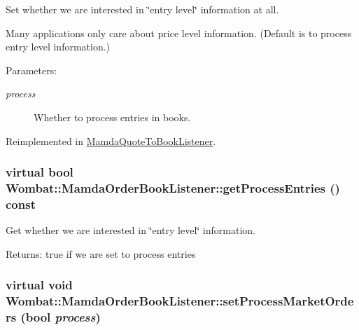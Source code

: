 Set whether we are interested in \char`\"{}entry level\char`\"{} information at all. 

Many applications only care about price level information. (Default is to process entry level information.)

\begin{Desc}
\item[Parameters:]
\begin{description}
\item[{\em process}]Whether to process entries in books. \end{description}
\end{Desc}


Reimplemented in \hyperlink{classMamdaQuoteToBookListener_21f81f9500c986f88ea910b97f086b39}{Mamda\-Quote\-To\-Book\-Listener}.\hypertarget{classWombat_1_1MamdaOrderBookListener_4e902b9efbce42035d6e7d455ff64e4e}{
\subsubsection[getProcessEntries]{\setlength{\rightskip}{0pt plus 5cm}virtual bool Wombat::Mamda\-Order\-Book\-Listener::get\-Process\-Entries () const}}
\label{classWombat_1_1MamdaOrderBookListener_4e902b9efbce42035d6e7d455ff64e4e}


Get whether we are interested in \char`\"{}entry level\char`\"{} information. 

\begin{Desc}
\item[Returns:]true if we are set to process entries \end{Desc}
\hypertarget{classWombat_1_1MamdaOrderBookListener_c1c364bb8b843f30464ae5ca275bd3c7}{
\subsubsection[setProcessMarketOrders]{\setlength{\rightskip}{0pt plus 5cm}virtual void Wombat::Mamda\-Order\-Book\-Listener::set\-Process\-Market\-Orders (bool {\em process})}}
\label{classWombat_1_1MamdaOrderBookListener_c1c364bb8b843f30464ae5ca275bd3c7}


